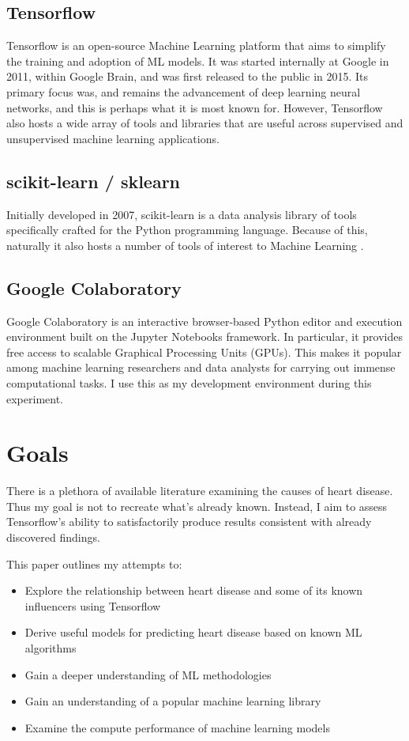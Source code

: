 \documentclass[conference]{IEEEtran}
\begin{document}
\subsection{Tensorflow}
Tensorflow is an open-source Machine Learning platform that aims to simplify the training and adoption of ML models. It was started internally at Google in 2011, within Google Brain, and was first released to the public in 2015\cite{b3}. Its primary focus was, and remains the advancement of deep learning neural networks, and this is perhaps what it is most known for. However, Tensorflow also hosts a wide array of tools and libraries that are useful across supervised and unsupervised machine learning applications\cite{b4}. 


\subsection{scikit-learn / sklearn}
Initially developed in 2007, scikit-learn is a data analysis library of tools specifically crafted for the Python programming language. Because of this, naturally it also hosts a number of tools of interest to Machine Learning \cite{b5}.

\subsection{Google Colaboratory}
Google Colaboratory is an interactive browser-based Python editor and execution environment built on the Jupyter Notebooks framework. In particular, it provides free access to scalable Graphical Processing Units (GPUs). This makes it popular among machine learning researchers and data analysts for carrying out immense computational tasks\cite{b7}. I use this as my development environment during this experiment. 


\section{Goals}
There is a plethora of available literature examining the causes of heart disease. Thus my goal is not to recreate what’s already known. Instead, I aim to assess Tensorflow’s ability to satisfactorily produce results consistent with already discovered findings. 

This paper outlines my attempts to:
\begin{itemize}
    \item Explore the relationship between heart disease and some of its known influencers using Tensorflow
    \item Derive useful models for predicting heart disease based on known ML algorithms
    \item Gain a deeper understanding of ML methodologies 
    \item Gain an understanding of a popular machine learning library
    \item Examine the compute performance of machine learning models
\end{itemize}
\end{document}

